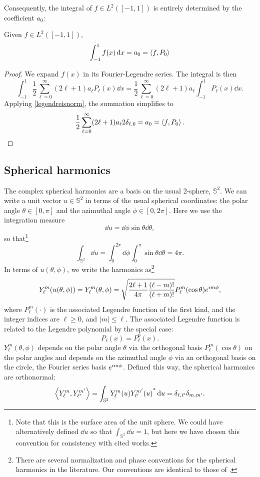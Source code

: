 \documentclass[../../main.tex]{subfiles}
\begin{document}
\begin{refsection}
	Consequently, the integral of $f \in L^2([-1, 1])$ is entirely determined by the coefficient $a_0$:
	\begin{theorem}\label{legendrefirstcoef}
		Given $f \in L^2([-1, 1])$,
		$$\int_{-1}^1 f(x) \dd{x} = a_0 = \left\langle f, P_0 \right\rangle$$
	\end{theorem}
	\begin{proof}
		We expand $f(x)$ in its Fourier-Legendre series.
		The integral is then
		$$\int_{-1}^1 \frac{1}{2} \sum_{\ell=0}^\infty (2\ell+1) a_\ell P_\ell(x) \dd{x} = \frac{1}{2} \sum_{\ell=0}^\infty (2\ell+1) a_\ell \int_{-1}^1 P_\ell(x) \dd{x}.$$
		Applying \cref{legendreisnorm}, the summation simplifies to
		$$\frac{1}{2} \sum_{\ell=0}^\infty (2\ell+1) a_\ell 2 \delta_{\ell,0} = a_0 = \left\langle f, P_0 \right\rangle.$$
	\end{proof}

	\subsection{Spherical harmonics}

	The complex spherical harmonics are a basis on the usual 2-sphere, $\mathbb{S}^2$.
	We can write a unit vector $u \in \mathbb{S}^2$ in terms of the usual spherical coordinates: the polar angle $\theta \in [0, \pi]$ and the azimuthal angle $\phi \in [0, 2\pi]$.
	Here we use the integration measure
	$$\dd{u} = \dd{\phi} \sin\theta \dd{\theta},$$
	so that\footnote{
		Note that this is the surface area of the unit sphere.
		We could have alternatively defined $\dd{u}$ so that $\int_{\mathbb{S}^2} \dd{u} = 1$, but here we have chosen this convention for consistency with cited works.}
	$$\int_{\mathbb{S}^2} \dd{u} = \int_0^{2\pi} \dd{\phi} \int_0^\pi \sin\theta \dd{\theta} = 4\pi.$$
	In terms of $u(\theta, \phi)$, we write the harmonics as\footnote{
		There are several normalization and phase conventions for the spherical harmonics in the literature.
		Our conventions are identical to those of \cite[Chapter 5]{varshalovichQuantumTheoryAngular1988}.}
	\begin{equation}\label{spher_harmon}
		Y_\ell^m(u(\theta, \phi)) = Y_\ell^m(\theta, \phi) = \sqrt{\frac{2\ell + 1}{4\pi} \frac{(\ell-m)!}{(\ell + m)!}} P_\ell^m(\cos\theta) e^{i m \phi},
	\end{equation}
	where $P_\ell^m(\cdot)$ is the associated Legendre function of the first kind, and the integer indices are $\ell \ge 0$, and $|m| \le \ell$.
	The associated Legendre function is related to the Legendre polynomial by the special case:
	$$P_\ell(x) = P_\ell^0(x).$$
	$Y_\ell^m(\theta, \phi)$ depends on the polar angle $\theta$ via the orthogonal basis $P_\ell^m(\cos\theta)$ on the polar angles and depends on the azimuthal angle $\phi$ via an orthogonal basis on the circle, the Fourier series basis $e^{i m \phi}$.
	Defined this way, the spherical harmonics are orthonormal:
	$$\left\langle Y_\ell^m, Y_{\ell'}^{m'} \right\rangle = \int_{\mathbb{S}^2} Y_\ell^m(u) {Y_{\ell'}^{m'}(u)}^* \dd{u} = \delta_{\ell,\ell'} \delta_{m,m'}.$$


\end{refsection}
\end{document}
